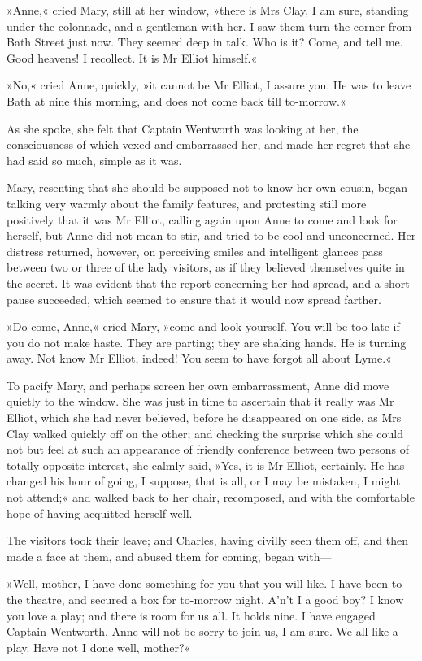 »Anne,« cried Mary, still at her window, »there is Mrs Clay, I am sure, standing under the colonnade, and a gentleman with her. I saw them turn the corner from Bath Street just now. They seemed deep in talk. Who is it? Come, and tell me. Good heavens! I recollect. It is Mr Elliot himself.«

»No,« cried Anne, quickly, »it cannot be Mr Elliot, I assure you. He was to leave Bath at nine this morning, and does not come back till to-morrow.«

As she spoke, she felt that Captain Wentworth was looking at her, the consciousness of which vexed and embarrassed her, and made her regret that she had said so much, simple as it was.

Mary, resenting that she should be supposed not to know her own cousin, began talking very warmly about the family features, and protesting still more positively that it was Mr Elliot, calling again upon Anne to come and look for herself, but Anne did not mean to stir, and tried to be cool and unconcerned. Her distress returned, however, on perceiving smiles and intelligent glances pass between two or three of the lady visitors, as if they believed themselves quite in the secret. It was evident that the report concerning her had spread, and a short pause succeeded, which seemed to ensure that it would now spread farther.

»Do come, Anne,« cried Mary, »come and look yourself. You will be too late if you do not make haste. They are parting; they are shaking hands. He is turning away. Not know Mr Elliot, indeed! You seem to have forgot all about Lyme.«

To pacify Mary, and perhaps screen her own embarrassment, Anne did move quietly to the window. She was just in time to ascertain that it really was Mr Elliot, which she had never believed, before he disappeared on one side, as Mrs Clay walked quickly off on the other; and checking the surprise which she could not but feel at such an appearance of friendly conference between two persons of totally opposite interest, she calmly said, »Yes, it is Mr Elliot, certainly. He has changed his hour of going, I suppose, that is all, or I may be mistaken, I might not attend;« and walked back to her chair, recomposed, and with the comfortable hope of having acquitted herself well.

The visitors took their leave; and Charles, having civilly seen them off, and then made a face at them, and abused them for coming, began with—

»Well, mother, I have done something for you that you will like. I have been to the theatre, and secured a box for to-morrow night. A'n't I a good boy? I know you love a play; and there is room for us all. It holds nine. I have engaged Captain Wentworth. Anne will not be sorry to join us, I am sure. We all like a play. Have not I done well, mother?«

